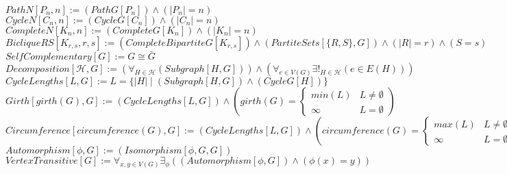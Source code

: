 \documentclass{book}
\newcommand{\abr}{:=}
\newcommand{\st}{\mathbin{|}}
\begin{document}
$PathN[P_n, n] \abr (PathG[P_n]) \land (|P_n| = n)$ \\
$CycleN[C_n, n] \abr (CycleG[C_n]) \land (|C_n| = n)$ \\
$CompleteN[K_n, n] \abr (CompleteG[K_n]) \land (|K_n| = n)$ \\
$BicliqueRS[K_{r, s}, r, s] \abr (CompleteBipartiteG[K_{r, s}]) \land (PartiteSets[\{R, S\}, G]) \land (|R| = r) \land (S = s)$ \\

$SelfComplementary[G] \abr G \cong \bar{G}$ \\
$Decomposition[\mathcal{H}, G] \abr (\forall_{H \in \mathcal{H}}(Subgraph[H, G])) \land (\forall_{e \in V(G)} \exists!_{H \in \mathcal{H}}(e \in E(H)))$ \\


$CycleLengths[L, G] \abr L = \{|H| \st (Subgraph[H, G]) \land (CycleG[H])\}$ \\
$Girth[girth(G), G] \abr (CycleLengths[L, G]) \land \left(girth(G) = 
\begin{cases} 
  min(L) & L \neq \emptyset \\
  \infty & L = \emptyset
\end{cases}\right)$ \\
$Circumference[circumference(G), G] \abr (CycleLengths[L, G]) \land \left(circumference(G) = 
\begin{cases} 
  max(L) & L \neq \emptyset \\
  \infty & L = \emptyset
\end{cases}\right)$ \\

$Automorphism[\phi, G] \abr (Isomorphism[\phi, G, G])$ \\ %
$VertexTransitive[G] \abr \forall_{x, y \in V(G)} \exists_{\phi}((Automorphism[\phi, G]) \land (\phi(x) = y))$ \\
\end{document}

